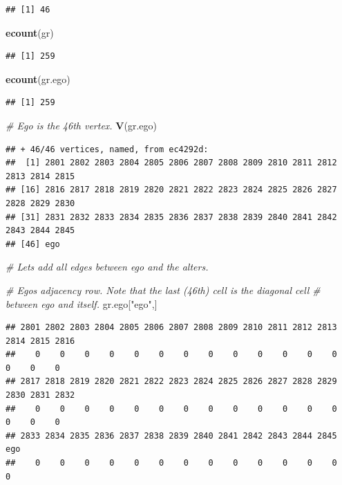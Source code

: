 \documentclass[
]{book}
\newenvironment{Shaded}{\begin{snugshade}}{\end{snugshade}}
\newcommand{\CommentTok}[1]{\textcolor[rgb]{0.56,0.35,0.01}{\textit{#1}}}
\newcommand{\FunctionTok}[1]{\textcolor[rgb]{0.13,0.29,0.53}{\textbf{#1}}}
\newcommand{\NormalTok}[1]{#1}
\newcommand{\StringTok}[1]{\textcolor[rgb]{0.31,0.60,0.02}{#1}}
\begin{document}
\begin{verbatim}
## [1] 46
\end{verbatim}

\begin{Shaded}
\begin{Highlighting}[]
\FunctionTok{ecount}\NormalTok{(gr)}
\end{Highlighting}
\end{Shaded}

\begin{verbatim}
## [1] 259
\end{verbatim}

\begin{Shaded}
\begin{Highlighting}[]
\FunctionTok{ecount}\NormalTok{(gr.ego)}
\end{Highlighting}
\end{Shaded}

\begin{verbatim}
## [1] 259
\end{verbatim}

\begin{Shaded}
\begin{Highlighting}[]
\CommentTok{\# Ego is the 46th vertex.}
\FunctionTok{V}\NormalTok{(gr.ego)}
\end{Highlighting}
\end{Shaded}

\begin{verbatim}
## + 46/46 vertices, named, from ec4292d:
##  [1] 2801 2802 2803 2804 2805 2806 2807 2808 2809 2810 2811 2812 2813 2814 2815
## [16] 2816 2817 2818 2819 2820 2821 2822 2823 2824 2825 2826 2827 2828 2829 2830
## [31] 2831 2832 2833 2834 2835 2836 2837 2838 2839 2840 2841 2842 2843 2844 2845
## [46] ego
\end{verbatim}

\begin{Shaded}
\begin{Highlighting}[]
\CommentTok{\# Let\textquotesingle{}s add all edges between ego and the alters.}

\CommentTok{\# Ego\textquotesingle{}s adjacency row. Note that the last (46th) cell is the diagonal cell}
\CommentTok{\# between ego and itself.}
\NormalTok{gr.ego[}\StringTok{"ego"}\NormalTok{,]}
\end{Highlighting}
\end{Shaded}

\begin{verbatim}
## 2801 2802 2803 2804 2805 2806 2807 2808 2809 2810 2811 2812 2813 2814 2815 2816 
##    0    0    0    0    0    0    0    0    0    0    0    0    0    0    0    0 
## 2817 2818 2819 2820 2821 2822 2823 2824 2825 2826 2827 2828 2829 2830 2831 2832 
##    0    0    0    0    0    0    0    0    0    0    0    0    0    0    0    0 
## 2833 2834 2835 2836 2837 2838 2839 2840 2841 2842 2843 2844 2845  ego 
##    0    0    0    0    0    0    0    0    0    0    0    0    0    0
\end{verbatim}
\end{document}
